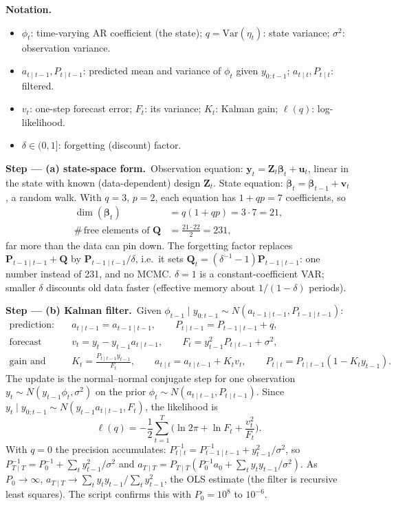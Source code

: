 \documentclass[11pt,a4paper]{article}
\newenvironment{notacao}{\par\smallskip\noindent\textbf{Notation.}\begin{itemize}[leftmargin=1.4em,topsep=1pt,itemsep=0pt]\small}{\end{itemize}}
\newcommand{\passo}[2]{\par\smallskip\noindent\textbf{Step --- #1.}~#2}
\begin{document}
\begin{sol}
\begin{notacao}
\item $\phi_t$: time-varying AR coefficient (the state); $q=\mathrm{Var}(\eta_t)$: state variance; $\sigma^2$: observation variance.
\item $a_{t\mid t-1},P_{t\mid t-1}$: predicted mean and variance of $\phi_t$ given $y_{0:t-1}$; $a_{t\mid t},P_{t\mid t}$: filtered.
\item $v_t$: one-step forecast error; $F_t$: its variance; $K_t$: Kalman gain; $\ell(q)$: log-likelihood.
\item $\delta\in(0,1]$: forgetting (discount) factor.
\end{notacao}

\passo{(a) state-space form}{Observation equation: $\bm y_t=\bm Z_t\bm\beta_t+\bm u_t$, linear in the state with known
(data-dependent) design $\bm Z_t$. State equation: $\bm\beta_t=\bm\beta_{t-1}+\bm v_t$, a random walk. With $q=3$,
$p=2$, each equation has $1+qp=7$ coefficients, so
\begin{align}
\dim(\bm\beta_t)&=q(1+qp)=3\cdot7=21,\nonumber\\
\#\,\text{free elements of }\bm Q&=\frac{21\cdot22}{2}=231,\nonumber
\end{align}
far more than the data can pin down. The forgetting factor replaces $\bm P_{t-1\mid t-1}+\bm Q$ by $\bm P_{t-1\mid t-1}/\delta$,
i.e.\ it sets $\bm Q_t=(\delta^{-1}-1)\bm P_{t-1\mid t-1}$: one number instead of 231, and no MCMC. $\delta=1$ is a
constant-coefficient VAR; smaller $\delta$ discounts old data faster (effective memory about $1/(1-\delta)$ periods).}

\passo{(b) Kalman filter}{Given $\phi_{t-1}\mid y_{0:t-1}\sim N(a_{t-1\mid t-1},P_{t-1\mid t-1})$:
\begin{align}
\text{prediction:}&\quad a_{t\mid t-1}=a_{t-1\mid t-1},\qquad P_{t\mid t-1}=P_{t-1\mid t-1}+q,\label{eq:q15pred}\\
\text{forecast error:}&\quad v_t=y_t-y_{t-1}a_{t\mid t-1},\qquad F_t=y_{t-1}^2P_{t\mid t-1}+\sigma^2,\label{eq:q15F}\\
\text{gain and update:}&\quad K_t=\frac{P_{t\mid t-1}y_{t-1}}{F_t},\qquad a_{t\mid t}=a_{t\mid t-1}+K_tv_t,\qquad
P_{t\mid t}=P_{t\mid t-1}(1-K_ty_{t-1}).\label{eq:q15upd}
\end{align}
The update is the normal--normal conjugate step for one observation $y_t\sim N(y_{t-1}\phi_t,\sigma^2)$ on the prior
$\phi_t\sim N(a_{t\mid t-1},P_{t\mid t-1})$. Since $y_t\mid y_{0:t-1}\sim N(y_{t-1}a_{t\mid t-1},F_t)$, the likelihood is
\begin{equation}
\ell(q)=-\frac12\sum_{t=1}^T\Big(\ln2\pi+\ln F_t+\frac{v_t^2}{F_t}\Big).\label{eq:q15ll}
\end{equation}
With $q=0$ the precision accumulates: $P_{t\mid t}^{-1}=P_{t-1\mid t-1}^{-1}+y_{t-1}^2/\sigma^2$, so
$P_{T\mid T}^{-1}=P_0^{-1}+\sum_ty_{t-1}^2/\sigma^2$ and $a_{T\mid T}=P_{T\mid T}(P_0^{-1}a_0+\sum_ty_ty_{t-1}/\sigma^2)$. As
$P_0\to\infty$, $a_{T\mid T}\to\sum_ty_ty_{t-1}/\sum_ty_{t-1}^2$, the OLS estimate (the filter is recursive least squares). The
script confirms this with $P_0=10^8$ to $10^{-6}$.}


\end{sol}
\end{document}
